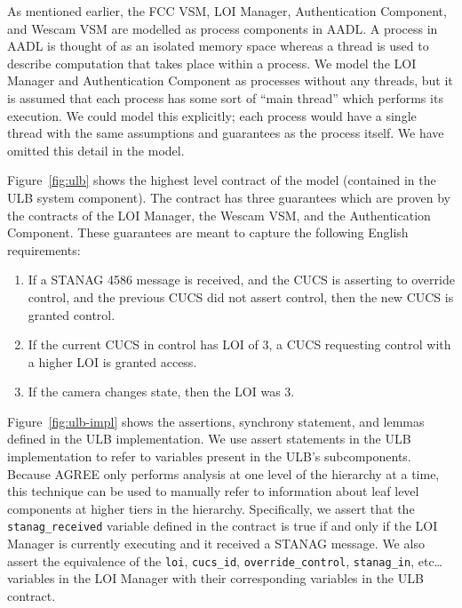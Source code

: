 \documentclass{llncs}
\begin{document}


As mentioned earlier, the FCC VSM, LOI Manager, Authentication Component, and Wescam VSM are modelled as process components in AADL. A process in AADL is thought of as an isolated memory space whereas a thread is used to describe computation that takes place within a process.  We model the LOI Manager and Authentication Component as processes without any threads, but it is assumed that each process has some sort of ``main thread'' which performs its execution.  We could model this explicitly; each process would have a single thread with the same assumptions and guarantees as the process itself.  We have omitted this detail in the model.

Figure~\ref{fig:ulb} shows the highest level contract of the model (contained in the ULB system component).  The contract has three guarantees which are proven by the contracts of the LOI Manager, the Wescam VSM, and the Authentication Component.  These guarantees are meant to capture the following English requirements:
\begin{enumerate}
\item If a STANAG 4586 message is received, and the CUCS is asserting to override control, and the previous CUCS did not assert control, then the new CUCS is granted control.

\item If the current CUCS in control has LOI of 3, a CUCS requesting control with a higher LOI is granted access.

\item If the camera changes state, then the LOI was 3.
\end{enumerate}



Figure~\ref{fig:ulb-impl} shows the assertions, synchrony statement, and lemmas defined in the ULB implementation. We use assert statements in the ULB implementation to refer to variables present in the ULB's subcomponents.  Because AGREE only performs analysis at one level of the hierarchy at a time, this technique can be used to manually refer to information about leaf level components at higher tiers in the hierarchy.  Specifically, we assert that the \texttt{stanag\_received} variable defined in the contract is true if and only if the LOI Manager is currently executing and it received a STANAG message.  We also assert the equivalence of the \texttt{loi}, \texttt{cucs\_id}, \texttt{override\_control}, \texttt{stanag\_in}, etc\ldots variables in the LOI Manager with their corresponding variables in the ULB contract.
\end{document}
